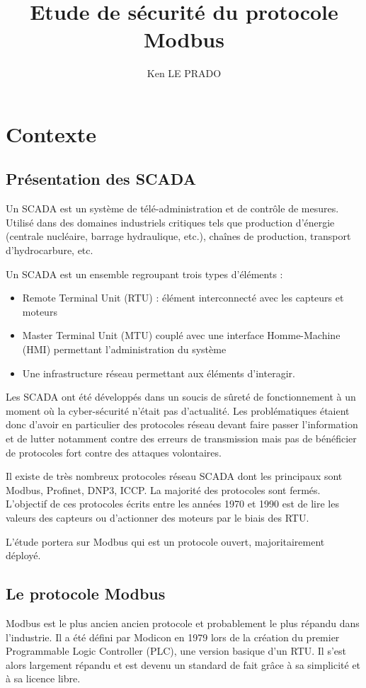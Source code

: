 \documentclass[10pt,a4paper]{article}
\author{Ken LE PRADO}
\title{Etude de sécurité du protocole Modbus}
\begin{document}
\section{Contexte}
	
	\subsection{Présentation des SCADA}
		Un SCADA est un système de télé-administration et de contrôle de mesures.
		Utilisé dans des domaines industriels critiques tels que production d'énergie (centrale nucléaire, barrage hydraulique, etc.), chaînes de production, transport d'hydrocarbure, etc.
		
		Un SCADA est un ensemble regroupant trois types d'éléments :
		\begin{itemize}
		\item Remote Terminal Unit (RTU) : élément interconnecté avec les capteurs et moteurs
		\item Master Terminal Unit (MTU) couplé avec une interface Homme-Machine (HMI) permettant l'administration du système
		\item Une infrastructure réseau permettant aux éléments d'interagir.
		\end{itemize}
		
		Les SCADA ont été développés dans un soucis de sûreté de fonctionnement à un moment où la cyber-sécurité n'était pas d'actualité. Les problématiques étaient donc d'avoir en particulier des protocoles réseau devant faire passer l'information et de lutter notamment contre des erreurs de transmission mais pas de bénéficier de protocoles fort contre des attaques volontaires.
		
		Il existe de très nombreux protocoles réseau SCADA dont les principaux sont Modbus, Profinet, DNP3, ICCP. La majorité des protocoles sont fermés. L'objectif de ces protocoles écrits entre les années 1970 et 1990 est de lire les valeurs des capteurs ou d'actionner des moteurs par le biais des RTU.
		
		L'étude portera sur Modbus qui est un protocole ouvert, majoritairement déployé.
	
	\subsection{Le protocole Modbus}
		Modbus est le plus ancien ancien protocole et probablement le plus répandu dans l'industrie. Il a été défini par Modicon en 1979 lors de la création du premier Programmable Logic Controller (PLC), une version basique d'un RTU. Il s'est alors largement répandu et est devenu un standard de fait grâce à sa simplicité et à sa licence libre.
\end{document}
